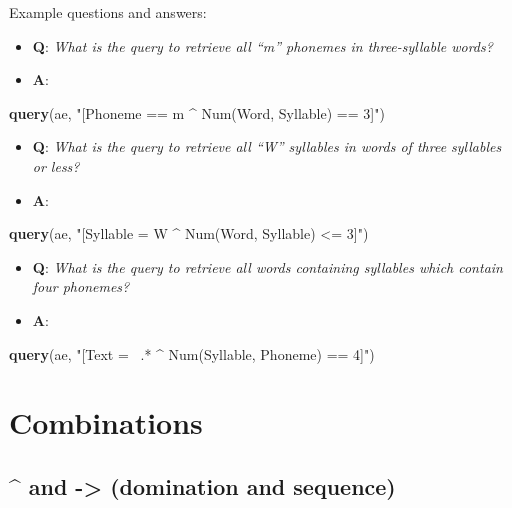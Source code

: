 \documentclass[]{book}
\newenvironment{Shaded}{\begin{snugshade}}{\end{snugshade}}
\newcommand{\KeywordTok}[1]{\textcolor[rgb]{0.13,0.29,0.53}{\textbf{#1}}}
\newcommand{\NormalTok}[1]{#1}
\newcommand{\StringTok}[1]{\textcolor[rgb]{0.31,0.60,0.02}{#1}}
\providecommand{\tightlist}{%
  \setlength{\itemsep}{0pt}\setlength{\parskip}{0pt}}
\theoremstyle{definition}
\theoremstyle{definition}
\theoremstyle{definition}
\theoremstyle{remark}
\begin{document}
Example questions and answers:

\begin{itemize}
\tightlist
\item
  \textbf{Q}: \emph{What is the query to retrieve all ``m'' phonemes in
  three-syllable words?}
\item
  \textbf{A}:
\end{itemize}

\begin{Shaded}
\begin{Highlighting}[]
\KeywordTok{query}\NormalTok{(ae, }\StringTok{"[Phoneme == m ^ Num(Word, Syllable) == 3]"}\NormalTok{)}
\end{Highlighting}
\end{Shaded}

\begin{itemize}
\tightlist
\item
  \textbf{Q}: \emph{What is the query to retrieve all ``W'' syllables in
  words of three syllables or less?}
\item
  \textbf{A}:
\end{itemize}

\begin{Shaded}
\begin{Highlighting}[]
\KeywordTok{query}\NormalTok{(ae, }\StringTok{"[Syllable = W ^ Num(Word, Syllable) <= 3]"}\NormalTok{)}
\end{Highlighting}
\end{Shaded}

\begin{itemize}
\tightlist
\item
  \textbf{Q}: \emph{What is the query to retrieve all words containing
  syllables which contain four phonemes?}
\item
  \textbf{A}:
\end{itemize}

\begin{Shaded}
\begin{Highlighting}[]
\KeywordTok{query}\NormalTok{(ae, }\StringTok{"[Text =~ .* ^ Num(Syllable, Phoneme) == 4]"}\NormalTok{)}
\end{Highlighting}
\end{Shaded}

\hypertarget{combinations}{%
\section{Combinations}\label{combinations}}

\hypertarget{and---domination-and-sequence}{%
\subsection{\^{} and -\textgreater{} (domination and
sequence)}\label{and---domination-and-sequence}}
\end{document}
